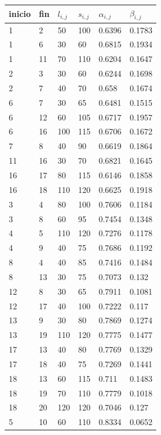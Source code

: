 \documentclass[letter, 10pt]{article}
\begin{document}
\begin{table}[H]
\centering
\begin{tabular}{|l|l|l|l|l|l|}
\hline
inicio & fin & $l_{i,j}$ & $s_{i,j}$ & $\alpha_{i,j}$ & $\beta_{i,j}$ \\ \hline
1 & 2 & 50 & 100 & 0.6396 & 0.1783 \\ \hline
1 & 6 & 30 & 60 & 0.6815 & 0.1934 \\ \hline
1 & 11 & 70 & 110 & 0.6204 & 0.1647 \\ \hline
2 & 3 & 30 & 60 & 0.6244 & 0.1698 \\ \hline
2 & 7 & 40 & 70 & 0.658 & 0.1674 \\ \hline
6 & 7 & 30 & 65 & 0.6481 & 0.1515 \\ \hline
6 & 12 & 60 & 105 & 0.6717 & 0.1957 \\ \hline
6 & 16 & 100 & 115 & 0.6706 & 0.1672 \\ \hline
7 & 8 & 40 & 90 & 0.6619 & 0.1864 \\ \hline
11 & 16 & 30 & 70 & 0.6821 & 0.1645 \\ \hline
16 & 17 & 80 & 115 & 0.6146 & 0.1858 \\ \hline
16 & 18 & 110 & 120 & 0.6625 & 0.1918 \\ \hline
3 & 4 & 80 & 100 & 0.7606 & 0.1184 \\ \hline
3 & 8 & 60 & 95 & 0.7454 & 0.1348 \\ \hline
4 & 5 & 110 & 120 & 0.7276 & 0.1178 \\ \hline
4 & 9 & 40 & 75 & 0.7686 & 0.1192 \\ \hline
8 & 4 & 40 & 85 & 0.7416 & 0.1484 \\ \hline
8 & 13 & 30 & 75 & 0.7073 & 0.132 \\ \hline
12 & 8 & 30 & 65 & 0.7911 & 0.1081 \\ \hline
12 & 17 & 40 & 100 & 0.7222 & 0.117 \\ \hline
13 & 9 & 30 & 80 & 0.7869 & 0.1274 \\ \hline
13 & 19 & 110 & 120 & 0.7775 & 0.1477 \\ \hline
17 & 13 & 40 & 80 & 0.7769 & 0.1329 \\ \hline
17 & 18 & 40 & 75 & 0.7269 & 0.1441 \\ \hline
18 & 13 & 60 & 115 & 0.711 & 0.1483 \\ \hline
18 & 19 & 70 & 110 & 0.7779 & 0.1018 \\ \hline
18 & 20 & 120 & 120 & 0.7046 & 0.127 \\ \hline
5 & 10 & 60 & 110 & 0.8334 & 0.0652 \\ \hline

\end{tabular}
\end{table}
\end{document}
